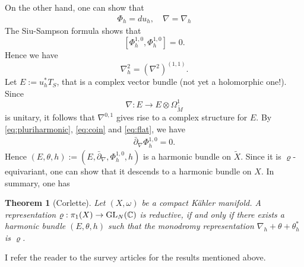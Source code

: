 \documentclass[english]{amsproc}
\theoremstyle{plain}
\newtheorem{thm}{Theorem}[section]
\theoremstyle{definition}
\theoremstyle{remark}
\theoremstyle{plain}
\numberwithin{equation}{thm} %
\newcommand{\bC}{\mathbb{C}}
\def\db{\bar{\partial}}
\newcommand{\GL}{{\rm GL}}
\begin{document}
On the other hand, one can show that
\begin{align}\label{eq:coin}
	\Phi_h=du_h, \quad \nabla=\nabla_h
\end{align}  
The Siu-Sampson formula shows that
$$
[\Phi_h^{1,0},\Phi_h^{1,0}]=0. 
$$
Hence we have
$$
\nabla_h^2=(\nabla^2)^{(1,1)}. 
$$
Let $E:=u_h^*T_S$, that is a complex vector bundle (not yet a holomorphic one!). Since 
$$
\nabla:E\to E\otimes \Omega_{\widetilde{M}}^1
$$ 
is unitary, it follows that $\nabla^{0,1}$ gives rise to a complex structure for $E$.  
By \eqref{eq:pluriharmonic}, \eqref{eq:coin} and \eqref{eq:flat}, we have
\begin{align}
	\db_\nabla \Phi_h^{1,0}=0. 
\end{align} 
Hence $(E,\theta,h):=(E,\db_\nabla,\Phi_h^{1,0},h)$ is a harmonic bundle on $\widetilde{X}$. Since it is $\varrho$-equivariant, one can show that it descends to a harmonic bundle on $X$. In summary, one has
\begin{thm}[Corlette]\label{thm:Corlette}
	Let $(X,\omega)$ be a compact K\"ahler manifold.  A representation $\varrho:\pi_1(X)\to \GL_{N}(\bC)$ is reductive, if and only if  there exists a harmonic bundle $(E,\theta,h)$ such that the monodromy representation $\nabla_h+\theta+\theta_h^*$  is $\varrho$. 
\end{thm}
I refer the reader to the survey articles \cite{Lou20,DM23,Mau15} for the results mentioned above.


\medspace
\end{document}
